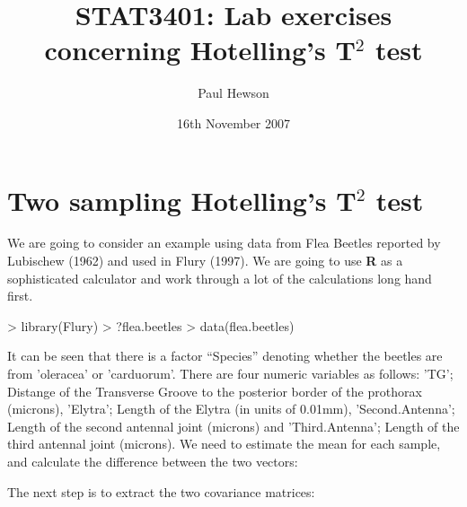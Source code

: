 \documentclass[11pt]{article}
\title{STAT3401: Lab exercises concerning Hotelling's T$^{2}$ test}
\author{Paul Hewson}
\date{16th November 2007}
\begin{document}
\setlength{\parindent}{0pt}
\setlength{\parskip}{12pt}
\sffamily
\maketitle


\section{Two sampling Hotelling's T$^{2}$ test}

We are going to consider an example using data from Flea Beetles reported by Lubischew (1962) and used in Flury (1997).  We are going to use \textbf{R} as a sophisticated calculator and work through a lot of the calculations long hand first.

\begin{Schunk}
\begin{Sinput}
> library(Flury)
> ?flea.beetles
> data(flea.beetles)
\end{Sinput}
\end{Schunk}


It can be seen that there is a factor ``Species'' denoting whether the beetles are from 'oleracea' or 'carduorum'.   There are four numeric variables as follows: 'TG'; Distange of the Transverse Groove to the posterior border of
          the prothorax (microns), 'Elytra'; Length of the Elytra (in units of 0.01mm), 'Second.Antenna'; Length of the second antennal joint (microns) and 'Third.Antenna'; Length of the third antennal joint (microns).   We need to estimate the mean for each sample, and calculate the difference between the two vectors:

\begin{Schunk}
\end{Schunk}

The next step is to extract the two covariance matrices:
\end{document}

